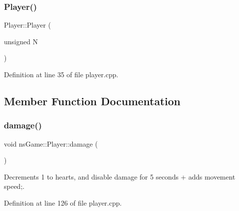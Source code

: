 \subsubsection{\texorpdfstring{Player()}{Player()}}
{\footnotesize\ttfamily Player\+::\+Player (\begin{DoxyParamCaption}\item[{unsigned}]{N }\end{DoxyParamCaption})}



Definition at line 35 of file player.\+cpp.



\subsection{Member Function Documentation}
\mbox{\label{classns_game_1_1_player_a6593cce5f194289c251eba839972aaac}} 
\subsubsection{\texorpdfstring{damage()}{damage()}}
{\footnotesize\ttfamily void ns\+Game\+::\+Player\+::damage (\begin{DoxyParamCaption}{ }\end{DoxyParamCaption})}



Decrements 1 to hearts, and disable damage for 5 seconds + adds movement speed;. 



Definition at line 126 of file player.\+cpp.

